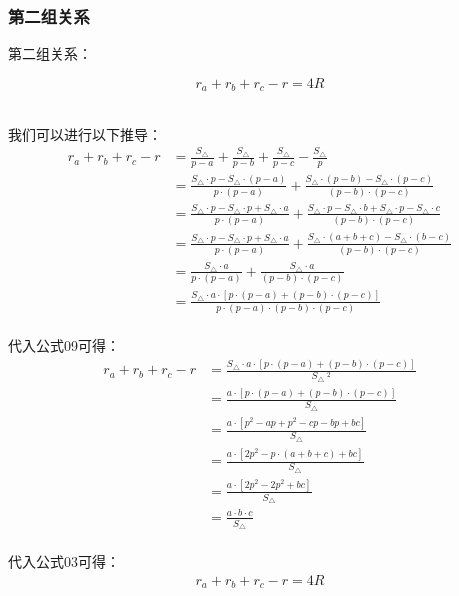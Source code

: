\documentclass[UTF8]{ctexart}
\begin{document}
\subsubsection{第二组关系}
    第二组关系：
    \begin{large}
        \begin{equation*}
            r_a+r_b+r_c-r=4R
        \end{equation*}
    \end{large}\\
    我们可以进行以下推导：
    \setcounter{equation}{0}
    \begin{align}
        r_a+r_b+r_c-r
        &=\frac{S_{\triangle}}{p-a}+\frac{S_{\triangle}}{p-b}+\frac{S_{\triangle}}{p-c}-\frac{S_{\triangle}}{p}\\[3mm]
        &=\frac{S_{\triangle}\cdot p-S_{\triangle}\cdot(p-a)}{p\cdot(p-a)}+\frac{S_{\triangle}\cdot (p-b)-S_{\triangle}\cdot(p-c)}{(p-b)\cdot(p-c)}\\[3mm]
        &=\frac{S_{\triangle}\cdot p-S_{\triangle}\cdot p+S_{\triangle}\cdot a}{p\cdot(p-a)}+\frac{S_{\triangle}\cdot p-S_{\triangle}\cdot b+S_{\triangle}\cdot p-S_{\triangle}\cdot c}{(p-b)\cdot(p-c)}\\[3mm]
        &=\frac{S_{\triangle}\cdot p-S_{\triangle}\cdot p+S_{\triangle}\cdot a}{p\cdot(p-a)}+\frac{S_{\triangle}\cdot (a+b+c)-S_{\triangle}\cdot (b-c)}{(p-b)\cdot(p-c)}\\[3mm]
        &=\frac{S_{\triangle}\cdot a}{p\cdot(p-a)}+\frac{S_{\triangle}\cdot a}{(p-b)\cdot(p-c)}\\[3mm]
        &=\frac{S_{\triangle}\cdot a\cdot\left[p\cdot(p-a)+(p-b)\cdot(p-c)\right]}{p\cdot(p-a)\cdot(p-b)\cdot(p-c)}
    \end{align}\\
    代入公式09可得：
    \begin{align}
        r_a+r_b+r_c-r
        &=\frac{S_{\triangle}\cdot a\cdot\left[p\cdot(p-a)+(p-b)\cdot(p-c)\right]}{S_{\triangle}~^2}\\[3mm]
        &=\frac{a\cdot[p\cdot(p-a)+(p-b)\cdot(p-c)]}{S_{\triangle}}\\[3mm]
        &=\frac{a\cdot[p^2-ap+p^2-cp-bp+bc]}{S_{\triangle}}\\[3mm]
        &=\frac{a\cdot[2p^2-p\cdot(a+b+c)+bc]}{S_{\triangle}}\\[3mm]
        &=\frac{a\cdot[2p^2-2p^2+bc]}{S_{\triangle}}\\[3mm]
        &=\frac{a\cdot b\cdot c}{S_{\triangle}}
    \end{align}\\
    代入公式$03$可得：
    \begin{align}
        r_a+r_b+r_c-r=4R
    \end{align}
\end{document}
